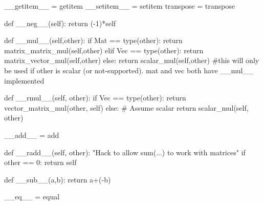 \documentclass[
  letterpaper,
  DIV=11,
  numbers=noendperiod]{scrartcl}
\newenvironment{Shaded}{\begin{snugshade}}{\end{snugshade}}
\newcommand{\BuiltInTok}[1]{\textcolor[rgb]{0.00,0.23,0.31}{#1}}
\newcommand{\CommentTok}[1]{\textcolor[rgb]{0.37,0.37,0.37}{#1}}
\newcommand{\ControlFlowTok}[1]{\textcolor[rgb]{0.00,0.23,0.31}{#1}}
\newcommand{\DecValTok}[1]{\textcolor[rgb]{0.68,0.00,0.00}{#1}}
\newcommand{\FunctionTok}[1]{\textcolor[rgb]{0.28,0.35,0.67}{#1}}
\newcommand{\KeywordTok}[1]{\textcolor[rgb]{0.00,0.23,0.31}{#1}}
\newcommand{\NormalTok}[1]{\textcolor[rgb]{0.00,0.23,0.31}{#1}}
\newcommand{\OperatorTok}[1]{\textcolor[rgb]{0.37,0.37,0.37}{#1}}
\newcommand{\VariableTok}[1]{\textcolor[rgb]{0.07,0.07,0.07}{#1}}
\begin{document}
\begin{Shaded}
\begin{Highlighting}[numbers=left,,]
    \FunctionTok{\_\_getitem\_\_} \OperatorTok{=}\NormalTok{ getitem}
    \FunctionTok{\_\_setitem\_\_} \OperatorTok{=}\NormalTok{ setitem}
\NormalTok{    transpose }\OperatorTok{=}\NormalTok{ transpose}

    \KeywordTok{def} \FunctionTok{\_\_neg\_\_}\NormalTok{(}\VariableTok{self}\NormalTok{):}
        \ControlFlowTok{return}\NormalTok{ (}\OperatorTok{{-}}\DecValTok{1}\NormalTok{)}\OperatorTok{*}\VariableTok{self}

    \KeywordTok{def} \FunctionTok{\_\_mul\_\_}\NormalTok{(}\VariableTok{self}\NormalTok{,other):}
        \ControlFlowTok{if}\NormalTok{ Mat }\OperatorTok{==} \BuiltInTok{type}\NormalTok{(other):}
            \ControlFlowTok{return}\NormalTok{ matrix\_matrix\_mul(}\VariableTok{self}\NormalTok{,other)}
        \ControlFlowTok{elif}\NormalTok{ Vec }\OperatorTok{==} \BuiltInTok{type}\NormalTok{(other):}
            \ControlFlowTok{return}\NormalTok{ matrix\_vector\_mul(}\VariableTok{self}\NormalTok{,other)}
        \ControlFlowTok{else}\NormalTok{:}
            \ControlFlowTok{return}\NormalTok{ scalar\_mul(}\VariableTok{self}\NormalTok{,other)}
            \CommentTok{\#this will only be used if other is scalar (or not{-}supported). mat and vec both have \_\_mul\_\_ implemented}

    \KeywordTok{def} \FunctionTok{\_\_rmul\_\_}\NormalTok{(}\VariableTok{self}\NormalTok{, other):}
        \ControlFlowTok{if}\NormalTok{ Vec }\OperatorTok{==} \BuiltInTok{type}\NormalTok{(other):}
            \ControlFlowTok{return}\NormalTok{ vector\_matrix\_mul(other, }\VariableTok{self}\NormalTok{)}
        \ControlFlowTok{else}\NormalTok{:  }\CommentTok{\# Assume scalar}
            \ControlFlowTok{return}\NormalTok{ scalar\_mul(}\VariableTok{self}\NormalTok{, other)}

    \FunctionTok{\_\_add\_\_} \OperatorTok{=}\NormalTok{ add}

    \KeywordTok{def} \FunctionTok{\_\_radd\_\_}\NormalTok{(}\VariableTok{self}\NormalTok{, other):}
        \CommentTok{"Hack to allow sum(...) to work with matrices"}
        \ControlFlowTok{if}\NormalTok{ other }\OperatorTok{==} \DecValTok{0}\NormalTok{:}
            \ControlFlowTok{return} \VariableTok{self}

    \KeywordTok{def} \FunctionTok{\_\_sub\_\_}\NormalTok{(a,b):}
        \ControlFlowTok{return}\NormalTok{ a}\OperatorTok{+}\NormalTok{(}\OperatorTok{{-}}\NormalTok{b)}

    \FunctionTok{\_\_eq\_\_} \OperatorTok{=}\NormalTok{ equal}


\end{Highlighting}
\end{Shaded}
\end{document}
